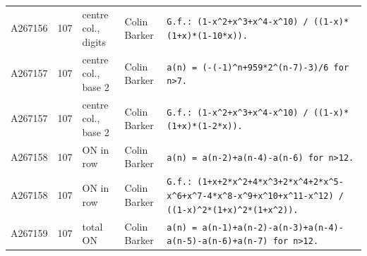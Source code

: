 \documentclass[11pt]{article}
\theoremstyle{definition}
\theoremstyle{remark}
\begin{document}
{\begin{longtable}{p{1.3cm}p{0.7cm}p{2.4cm}p{2.3cm}p{7.3cm}}
A267156 & 107 & centre col., digits & Colin Barker & \texttt{G.f.: \allowbreak{}(1-\allowbreak{}x\^{}2+\allowbreak{}x\^{}3+\allowbreak{}x\^{}4-\allowbreak{}x\^{}10)\allowbreak{} \allowbreak{}/\allowbreak{} \allowbreak{}((1-\allowbreak{}x)\allowbreak{}*\allowbreak{}(1+\allowbreak{}x)\allowbreak{}*\allowbreak{}(1-\allowbreak{}10*\allowbreak{}x)\allowbreak{})\allowbreak{}.} \\
A267157 & 107 & centre col., base 2 & Colin Barker & \texttt{a(n)\allowbreak{} \allowbreak{}=\allowbreak{} \allowbreak{}(-\allowbreak{}(-\allowbreak{}1)\allowbreak{}\^{}n+\allowbreak{}959*\allowbreak{}2\^{}(n-\allowbreak{}7)\allowbreak{}-\allowbreak{}3)\allowbreak{}/\allowbreak{}6 \allowbreak{}for \allowbreak{}n>7.} \\
A267157 & 107 & centre col., base 2 & Colin Barker & \texttt{G.f.: \allowbreak{}(1-\allowbreak{}x\^{}2+\allowbreak{}x\^{}3+\allowbreak{}x\^{}4-\allowbreak{}x\^{}10)\allowbreak{} \allowbreak{}/\allowbreak{} \allowbreak{}((1-\allowbreak{}x)\allowbreak{}*\allowbreak{}(1+\allowbreak{}x)\allowbreak{}*\allowbreak{}(1-\allowbreak{}2*\allowbreak{}x)\allowbreak{})\allowbreak{}.} \\
A267158 & 107 & ON in row & Colin Barker & \texttt{a(n)\allowbreak{} \allowbreak{}=\allowbreak{} \allowbreak{}a(n-\allowbreak{}2)\allowbreak{}+\allowbreak{}a(n-\allowbreak{}4)\allowbreak{}-\allowbreak{}a(n-\allowbreak{}6)\allowbreak{} \allowbreak{}for \allowbreak{}n>12.} \\
A267158 & 107 & ON in row & Colin Barker & \texttt{G.f.: \allowbreak{}(1+\allowbreak{}x+\allowbreak{}2*\allowbreak{}x\^{}2+\allowbreak{}4*\allowbreak{}x\^{}3+\allowbreak{}2*\allowbreak{}x\^{}4+\allowbreak{}2*\allowbreak{}x\^{}5-\allowbreak{}x\^{}6+\allowbreak{}x\^{}7-\allowbreak{}4*\allowbreak{}x\^{}8-\allowbreak{}x\^{}9+\allowbreak{}x\^{}10+\allowbreak{}x\^{}11-\allowbreak{}x\^{}12)\allowbreak{} \allowbreak{}/\allowbreak{} \allowbreak{}((1-\allowbreak{}x)\allowbreak{}\^{}2*\allowbreak{}(1+\allowbreak{}x)\allowbreak{}\^{}2*\allowbreak{}(1+\allowbreak{}x\^{}2)\allowbreak{})\allowbreak{}.} \\
A267159 & 107 & total ON & Colin Barker & \texttt{a(n)\allowbreak{} \allowbreak{}=\allowbreak{} \allowbreak{}a(n-\allowbreak{}1)\allowbreak{}+\allowbreak{}a(n-\allowbreak{}2)\allowbreak{}-\allowbreak{}a(n-\allowbreak{}3)\allowbreak{}+\allowbreak{}a(n-\allowbreak{}4)\allowbreak{}-\allowbreak{}a(n-\allowbreak{}5)\allowbreak{}-\allowbreak{}a(n-\allowbreak{}6)\allowbreak{}+\allowbreak{}a(n-\allowbreak{}7)\allowbreak{} \allowbreak{}for \allowbreak{}n>12.} \\

\end{longtable}}
\end{document}
